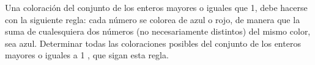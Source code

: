 Una coloración del conjunto de los enteros mayores o iguales que 1, debe hacerse con la siguiente regla: cada número se colorea de azul o rojo, de manera que la suma de cualesquiera dos números (no necesariamente distintos) del mismo color, sea azul. Determinar todas las coloraciones posibles del conjunto de los enteros mayores o iguales a 1 , que sigan esta regla.